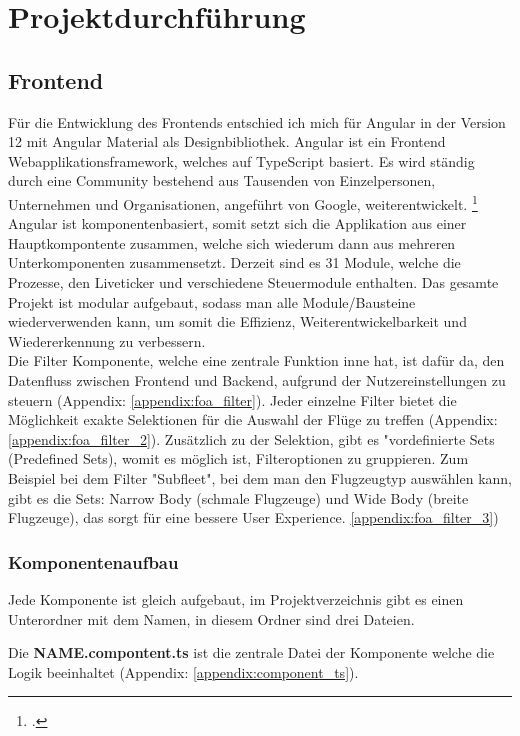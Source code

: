 \section{Projektdurchführung}

	\subsection{Frontend}
	Für die Entwicklung des Frontends entschied ich mich für Angular in der Version 12 mit Angular Material als Designbibliothek. Angular ist ein Frontend Webapplikationsframework, welches auf TypeScript basiert. Es wird ständig durch eine Community bestehend aus Tausenden von Einzelpersonen, Unternehmen und Organisationen, angeführt von Google, weiterentwickelt. \footcite{3}\\
	Angular ist komponentenbasiert, somit setzt sich die Applikation aus einer Hauptkompontente zusammen, welche sich wiederum dann aus mehreren Unterkomponenten zusammensetzt. Derzeit sind es 31 Module, welche die Prozesse, den Liveticker und verschiedene Steuermodule enthalten. Das gesamte Projekt ist modular aufgebaut, sodass man alle Module/Bausteine wiederverwenden kann, um somit die Effizienz, Weiterentwickelbarkeit und Wiedererkennung zu verbessern.\\
	Die Filter Komponente, welche eine zentrale Funktion inne hat, ist dafür da, den Datenfluss zwischen Frontend und Backend, aufgrund der Nutzereinstellungen zu steuern (Appendix: \ref{appendix:foa_filter}). Jeder einzelne Filter bietet die Möglichkeit exakte Selektionen für die Auswahl der Flüge zu treffen (Appendix: \ref{appendix:foa_filter_2}). Zusätzlich zu der Selektion, gibt es "vordefinierte Sets (Predefined Sets), womit es möglich ist, Filteroptionen zu gruppieren. Zum Beispiel bei dem Filter "Subfleet", bei dem man den Flugzeugtyp auswählen kann, gibt es die Sets: Narrow Body (schmale Flugzeuge) und Wide Body (breite Flugzeuge), das sorgt für eine bessere User Experience. \ref{appendix:foa_filter_3})

	\subsubsection{Komponentenaufbau}
	{
		\noindent
		Jede Komponente ist gleich aufgebaut, im Projektverzeichnis gibt es einen Unterordner mit dem Namen, in diesem Ordner sind drei Dateien.
	}
	\vspace{10pt}

	{
		\noindent
		Die \textbf{NAME.compontent.ts} ist die zentrale Datei der Komponente welche die Logik beeinhaltet (Appendix: \ref{appendix:component_ts}).
	}
	\vspace{10pt}


